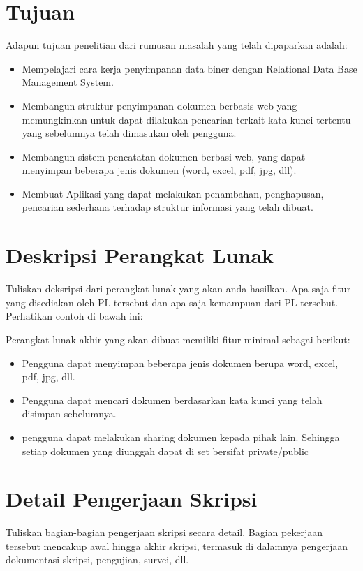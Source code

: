 \documentclass[a4paper,twoside]{article}
\begin{document}
\section{Tujuan}
Adapun tujuan penelitian dari rumusan masalah yang telah dipaparkan adalah:
\begin{itemize}
	\item Mempelajari cara kerja penyimpanan data biner dengan Relational Data Base Management System.
	\item Membangun struktur penyimpanan dokumen berbasis web yang memungkinkan untuk dapat dilakukan pencarian terkait kata kunci tertentu yang sebelumnya telah dimasukan oleh pengguna.
	\item Membangun sistem pencatatan dokumen berbasi web, yang dapat menyimpan beberapa jenis dokumen (word, excel, pdf, jpg, dll).
	\item Membuat Aplikasi yang dapat melakukan penambahan, penghapusan, pencarian sederhana terhadap struktur informasi yang telah dibuat.
	
\end{itemize}

\section{Deskripsi Perangkat Lunak}
Tuliskan deksripsi dari perangkat lunak yang akan anda hasilkan. Apa saja fitur yang disediakan oleh PL tersebut dan apa saja kemampuan dari PL tersebut. Perhatikan contoh di bawah ini:

Perangkat lunak akhir yang akan dibuat memiliki fitur minimal sebagai berikut:
\begin{itemize}
	\item Pengguna dapat menyimpan beberapa jenis dokumen berupa word, excel, pdf, jpg, dll.
	\item Pengguna dapat mencari dokumen berdasarkan kata kunci yang telah disimpan sebelumnya.
	\item pengguna dapat melakukan sharing dokumen kepada pihak lain. Sehingga setiap dokumen yang diunggah dapat di set bersifat private/public
	
		
\end{itemize}

\section{Detail Pengerjaan Skripsi}
Tuliskan bagian-bagian pengerjaan skripsi secara detail. Bagian pekerjaan tersebut mencakup awal hingga akhir skripsi, termasuk di dalamnya pengerjaan dokumentasi skripsi, pengujian, survei, dll.
\end{document}
